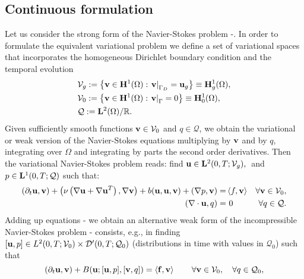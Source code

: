 \subsection{Continuous formulation}
\label{subsec-variational_continuous}
Let us consider the strong form of the Navier-Stokes problem -. In order to formulate the equivalent variational problem we define a set of variational spaces that incorporates the homogeneous Dirichlet boundary condition and the temporal evolution
\begin{align}
\label{eq-C2_varia_NS_u_space}
&\mathcal{V}_g:=\left\{{\bf v}\in{\bf H}^1(\Omega):\left.{\bf v}\right|_{\Gamma_D}={\bf u}_g\right\}\equiv{\bf H}^1_g(\Omega),\\
\label{eq-C2_varia_NS_v_space}
&\mathcal{V}_0:=\left\{{\bf v}\in{\bf H}^1(\Omega):\left.{\bf v}\right|_\Gamma=0\right\}\equiv{\bf H}^1_0(\Omega),\\
\label{eq-C2_varia_NS_p_space}
&\mathcal{Q}:={\bf L}^2(\Omega)/\mathbb{R}.
\end{align}
Given sufficiently smooth functions $ {\bf v}\in\mathcal{V}_0 $ and $ q\in\mathcal{Q} $, we obtain the variational or weak version of the Navier-Stokes equations multiplying  by $ {\bf v} $  and  by $ q $, integrating over $ \Omega $ and integrating by parts the second order derivatives. Then the variational Navier-Stokes problem reads: find $ {\bf u}\in{\bf L}^2(0,T;\mathcal{V}_g),\\ $ and $ p\in{\bf L}^1(0,T;\mathcal{Q}) $ such that: 
\begin{align}
\label{eq-C2_varia_NS_weak_momentum}
(\partial_t{\bf u},{\bf v})+\left(\nu\left(\nabla{\bf u}+\nabla{\bf u}^T\right),\nabla{\bf v}\right)+b({\bf u},{\bf u},{\bf v})+(\nabla p,{\bf v})=&\left\langle f,{\bf v}\right\rangle&\forall{\bf v}\in\mathcal{V}_0,\\
\label{eq-C2_varia_NS_weak_continuity}
(\nabla\cdot{\bf u},q)=&\ 0&\forall q\in\mathcal{Q}.
\end{align}
Adding up equations - we obtain an alternative weak form of the incompressible Navier-Stokes problem - consists, e.g., in finding $[{\bf u},p]\in {L}^2(0,T;\mathcal{V}_0)\times {\cal D}'(0,T;\mathcal{Q}_0)$ (distributions in time with values in $\mathcal{Q}_0$) such that
\begin{equation}
\label{eq-C2_NS_weak}
(\partial_t{\bf u},{\bf v}) + B({\bf u};[{\bf u},p],[{\bf v},q]) = \left<{\bf f},{\bf v}\right> 
\quad\quad\forall{\bf v}\in\mathcal{V}_0,\quad\forall q\in\mathcal{Q}_0,
\end{equation}
